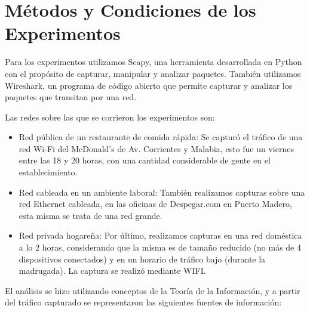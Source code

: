 \section{Métodos y Condiciones de los Experimentos}

Para los experimentos utilizamos Scapy, una herramienta desarrollada en Python con el propósito de capturar, manipular y analizar paquetes. También utilizamos Wireshark, un programa de código abierto que permite capturar y analizar los paquetes que transitan por una red.

Las redes sobre las que se corrieron los experimentos son:

\begin{itemize}

  \item Red pública de un restaurante de comida rápida: Se capturó el tráfico de una red Wi-Fi del McDonald's de Av. Corrientes y Malabia, esto fue un viernes entre las 18 y 20 horas, con una cantidad considerable de gente en el establecimiento.
  
  \item Red cableada en un ambiente laboral: También realizamos capturas sobre una red Ethernet cableada, en las oficinas de Despegar.com en Puerto Madero, esta misma se trata de una red grande.
  
  \item Red privada hogareña: Por último, realizamos capturas en una red doméstica a lo 2 horas, considerando que la misma es de tamaño reducido (no más de 4 dispositivos conectados) y en un horario de tráfico bajo (durante la madrugada). La captura se realizó mediante WIFI.

\end{itemize}

El análisis se hizo utilizando conceptos de la Teoría de la Información, y a partir del tráfico capturado se representaron las siguientes fuentes de información:

